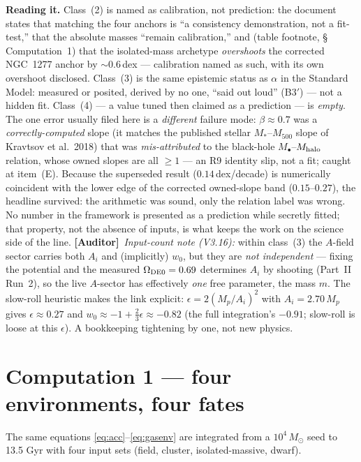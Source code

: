 \documentclass[11pt]{article}
\newcommand{\Auditor}{\textbf{\textcolor{teal!55!black}{[Auditor]}}}
\newcommand{\msun}{M_\odot}
\begin{document}
\noindent\textbf{Reading it.} Class~(2) is named as calibration, not prediction: the document states that matching the four anchors is ``a consistency demonstration, not a fit-test,'' that the absolute masses ``remain calibration,'' and (table footnote, \S\,Computation~1) that the isolated-mass archetype \emph{overshoots} the corrected NGC~1277 anchor by $\sim$0.6\,dex --- calibration named as such, with its own overshoot disclosed. Class~(3) is the same epistemic status as $\alpha$ in the Standard Model: measured or posited, derived by no one, ``said out loud'' (B3$'$) --- not a hidden fit. Class~(4) --- a value tuned then claimed as a prediction --- is \emph{empty}. The one error usually filed here is a \emph{different} failure mode: $\beta\!\approx\!0.7$ was a \emph{correctly-computed} slope (it matches the published stellar $M_{*}$--$M_{500}$ slope of Kravtsov et al.\ 2018) that was \emph{mis-attributed} to the black-hole $M_\bullet$--$M_{\rm halo}$ relation, whose owned slopes are all $\ge1$ --- an R9 identity slip, not a fit; caught at item~(E). Because the superseded result ($0.14$\,dex/decade) is numerically coincident with the lower edge of the corrected owned-slope band ($0.15$--$0.27$), the headline survived: the arithmetic was sound, only the relation label was wrong. No number in the framework is presented as a prediction while secretly fitted; that property, not the absence of inputs, is what keeps the work on the science side of the line. \Auditor\ \emph{Input-count note (V3.16):} within class~(3) the $A$-field sector carries both $A_i$ and (implicitly) $w_0$, but they are \emph{not independent} --- fixing the potential and the measured $\Omega_{\rm DE0}=0.69$ determines $A_i$ by shooting (Part~II Run~2), so the live $A$-sector has effectively \emph{one} free parameter, the mass $m$. The slow-roll heuristic makes the link explicit: $\epsilon=2(M_p/A_i)^2$ with $A_i=2.70\,M_p$ gives $\epsilon\approx0.27$ and $w_0\approx-1+\tfrac23\epsilon\approx-0.82$ (the full integration's $-0.91$; slow-roll is loose at this $\epsilon$). A bookkeeping tightening by one, not new physics.


\section{Computation 1 --- four environments, four fates}
The same equations \eqref{eq:acc}--\eqref{eq:gasenv} are integrated from a $10^4\,\msun$ seed to 13.5 Gyr with four input sets (field, cluster, isolated-massive, dwarf).
\end{document}
